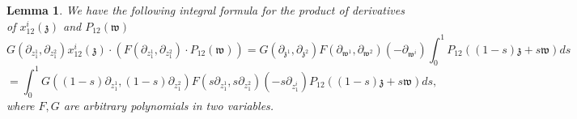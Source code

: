 \documentclass[11pt]{amsart}
\newtheorem{lem}[thm]{Lemma}
\theoremstyle{definition}
\theoremstyle{remark}
\numberwithin{equation}{section}
\begin{document}
\begin{lem}\label{IntegralXP}
We have the following integral formula for the product of derivatives of $x^i_{12}(\mathfrak{z})$ and $P_{12}(\mathfrak{w})$
  $$
G(\partial_{z^1_{1}},\partial_{z^2_{1}})x^i_{12}(\mathfrak{z})\cdot\left( F(\partial_{z^1_{1}},\partial_{z^2_{1}})\cdot P_{12}(\mathfrak{w})\right)=G(\partial_{\mathfrak{z}^1},\partial_{\mathfrak{z}^2})F(\partial_{\mathfrak{w}^1},\partial_{\mathfrak{w}^2})(-\partial_{\mathfrak{w}^i})\int^1_0P_{12}\left((1-s)\mathfrak{z}+s\mathfrak{w}\right)ds
  $$
  $$
  =\int^1_0G\left((1-s)\partial_{z^1_1},(1-s)\partial_{z^2_1}\right)F\left(s\partial_{z^1_1},s\partial_{z^2_1}\right)(-s\partial_{z^i_1})P_{12}\left((1-s)\mathfrak{z}+s\mathfrak{w}\right)ds,
  $$
  where $F,G$ are arbitrary polynomials in two variables.
\end{lem}
\end{document}
